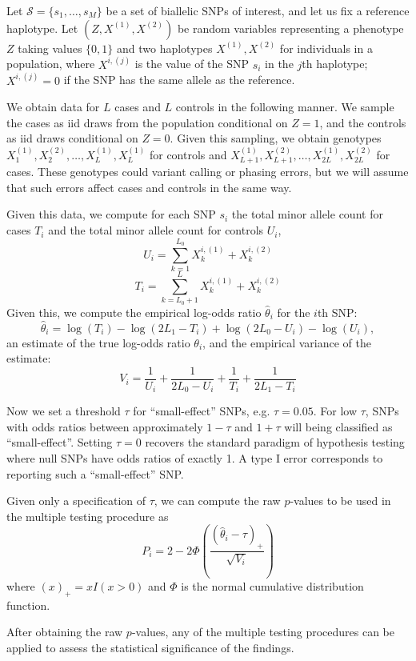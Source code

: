 \documentclass[12pt]{article}
\begin{document}
Let $\mathcal{S}= \{s_1,\hdots,s_M\}$ be a set of biallelic SNPs of interest,
and let us fix a reference haplotype.
Let $(Z,X^{(1)}, X^{(2)})$ be random variables representing
a phenotype $Z$ taking values $\{0,1\}$ and two haplotypes $X^{(1)}, X^{(2)}$ for individuals
in a population, where $X^{i,(j)}$ is the value of the SNP $s_i$ in
the $j$th haplotype; $X^{i,(j)}=0$ if the SNP has the same allele as
the reference.

We obtain data for $L$ cases and $L$ controls
in the following manner.
We sample the cases as iid draws from the population
conditional on $Z=1$, and the controls as iid draws
conditional on $Z=0$.
Given this sampling, we obtain genotypes
$X^{(1)}_1,X^{(2)}_2,\hdots,X^{(1)}_L,X^{(1)}_L$ for
controls
and $X^{(1)}_{L+1}, X^{(2)}_{L+1},\hdots,X^{(1)}_{2L},X^{(2)}_{2L}$
for cases.
These genotypes could variant calling or phasing errors,
but we will assume that such errors
affect cases and controls in the same way.

Given this data, we compute for each SNP $s_i$ the total minor allele count
for cases $T_i$ and the total minor allele count for controls $U_i$,
\[
U_i = \sum_{k=1}^{L_0} X^{i,(1)}_k + X^{i,(2)}_k
\]
\[
T_i = \sum_{k=L_0+1}^{L} X^{i,(1)}_k + X^{i,(2)}_k
\]
Given this, we compute the empirical log-odds ratio $\hat{\theta}_i$ for the $i$th SNP:
\[
\hat{\theta}_i = \log(T_i) - \log(2L_1- T_i) + \log(2L_0-U_i) - \log(U_i),
\]
an estimate of the true log-odds ratio $\theta_i$,
and the empirical variance\cite{Morris1998} of the estimate:
\[
V_i = \frac{1}{U_i} + \frac{1}{2L_0 - U_i} + \frac{1}{T_i} + \frac{1}{2L_1-T_i}
\]

Now we set a threshold $\tau$ for ``small-effect'' SNPs, e.g. $\tau=0.05$.
For low $\tau$, SNPs with odds ratios between approximately $1-\tau$
and $1+\tau$ will being classified as ``small-effect''.
Setting $\tau=0$ recovers the standard paradigm of hypothesis testing
where null SNPs have odds ratios of exactly 1.
A type I error corresponds to reporting such a ``small-effect'' SNP.

Given only a specification of $\tau$, we can compute the raw
$p$-values
to be used in the multiple testing procedure as
\[
P_i = 2-2\Phi\left(\frac{(\hat{\theta}_i-\tau)_+}{\sqrt{V_i}}\right)
\]
where $(x)_+ = xI(x > 0)$ and $\Phi$ is the normal cumulative distribution function.

After obtaining the raw $p$-values,
any of the multiple testing procedures \cite{Lin2005}
\cite{Dudbridge2006}
\cite{Storey2003}
can be applied to assess the statistical significance of
the findings.
\end{document}
